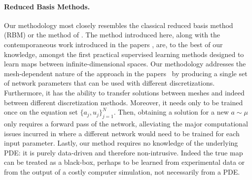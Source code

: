 \paragraph{Reduced Basis Methods.}
Our methodology most closely
resembles the classical reduced basis method (RBM) \citep{DeVoreReducedBasis} or the method of \citet{cohendevore}. 
The method introduced here, along with the contemporaneous work introduced
in the papers \citep{ Kovachki,nelsen2020random,opschoor2020deep, schwab2019deep, o2020derivative, lu2019deeponet,fresca2022poddlrom}, are, to the best of our knowledge, 
amongst the first practical supervised learning methods designed to learn maps between infinite-dimensional spaces. Our methodology 
addresses the mesh-dependent nature of the approach in the papers~\citep{guo2016convolutional, Zabaras, Adler2017, bhatnagar2019prediction} by producing a single set of network
parameters that can be used with different discretizations. 
Furthermore, it has the ability to transfer solutions between meshes and indeed
between different discretization methods. Moreover, it needs only to be trained once on the equation set  \(\{a_j, u_j\}_{j=1}^N\). Then, obtaining a solution for a new \(a \sim \mu\) only requires a forward pass of the network, alleviating the major computational issues incurred in \citep{Weinan, raissi2019physics, herrmann2020deep, bar2019unsupervised}
where a different network would need to be trained for each input
parameter. Lastly, 
our method requires no knowledge of the underlying PDE: it is purely
data-driven and therefore non-intrusive. Indeed the true map can be treated as a black-box, perhaps to be learned from experimental data or from the output of a costly computer simulation, not necessarily from a PDE. 


